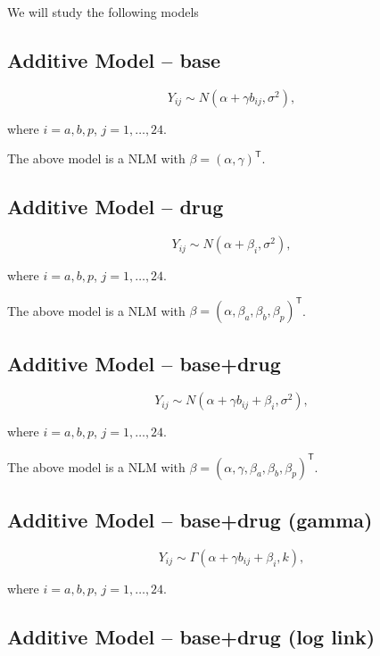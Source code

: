 \documentclass[a4paper,oneside]{memoir}
\begin{document}
We will study the following models

\hypertarget{additive-model-base}{%
\subsection{Additive Model -- base}\label{additive-model-base}}

\[Y_{ij}\sim N\left(\alpha + \gamma b_{ij}, \sigma^2\right),\]

where \(i=a,b,p\), \(j=1,\dots,24\).

The above model is a NLM with \(\beta=\left(\alpha, \gamma \right)^\textsf{T}\).

\hypertarget{additive-model-drug}{%
\subsection{Additive Model -- drug}\label{additive-model-drug}}

\[Y_{ij}\sim N\left(\alpha + \beta_{i}, \sigma^2\right),\]

where \(i=a,b,p\), \(j=1,\dots,24\).

The above model is a NLM with \(\beta=\left(\alpha, \beta_{a}, \beta_b, \beta_p \right)^\textsf{T}\).

\hypertarget{additive-model-basedrug}{%
\subsection{Additive Model -- base+drug}\label{additive-model-basedrug}}

\[Y_{ij}\sim N\left(\alpha + \gamma b_{ij} + \beta_{i}, \sigma^2\right),\]

where \(i=a,b,p\), \(j=1,\dots,24\).

The above model is a NLM with \(\beta=\left(\alpha, \gamma, \beta_{a}, \beta_b, \beta_p \right)^\textsf{T}\).

\hypertarget{additive-model-basedrug-gamma}{%
\subsection{Additive Model -- base+drug (gamma)}\label{additive-model-basedrug-gamma}}

\[Y_{ij}\sim \Gamma\left(\alpha + \gamma b_{ij} + \beta_{i}, k\right),\]

where \(i=a,b,p\), \(j=1,\dots,24\).

\hypertarget{additive-model-basedrug-log-link}{%
\subsection{Additive Model -- base+drug (log link)}\label{additive-model-basedrug-log-link}}
\end{document}
